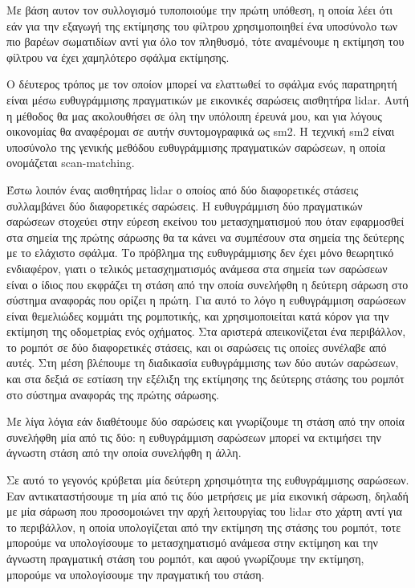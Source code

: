 \documentclass[a4paper,10pt]{article}
\begin{document}
Με βάση αυτον τον συλλογισμό τυποποιούμε την πρώτη υπόθεση, η οποία λέει ότι
εάν για την εξαγωγή της εκτίμησης του φίλτρου χρησιμοποιηθεί ένα υποσύνολο των
πιο βαρέων σωματιδίων αντί για όλο τον πληθυσμό, τότε αναμένουμε η εκτίμηση
του φίλτρου να έχει χαμηλότερο σφάλμα εκτίμησης.


Ο δέυτερος τρόπος με τον οποίον μπορεί να ελαττωθεί το σφάλμα ενός
παρατηρητή είναι μέσω ευθυγράμμισης πραγματικών με εικονικές σαρώσεις αισθητήρα
lidar. Αυτή η μέθοδος θα μας ακολουθήσει σε όλη την υπόλοιπη έρευνά μου, και
για λόγους οικονομίας θα αναφέρομαι σε αυτήν συντομογραφικά ως sm2. Η τεχνική
sm2 είναι υποσύνολο της γενικής μεθόδου ευθυγράμμισης πραγματικών σαρώσεων, η
οποία ονομάζεται scan-matching.

Έστω λοιπόν ένας αισθητήρας lidar ο οποίος από δύο διαφορετικές στάσεις
συλλαμβάνει δύο διαφορετικές σαρώσεις. Η ευθυγράμμιση δύο πραγματικών σαρώσεων
στοχεύει στην εύρεση εκείνου του μετασχηματισμού που όταν εφαρμοσθεί στα σημεία
της πρώτης σάρωσης θα τα κάνει να συμπέσουν στα σημεία της δεύτερης με το
ελάχιστο σφάλμα. Το πρόβλημα της ευθυγράμμισης δεν έχει μόνο θεωρητικό
ενδιαφέρον, γιατι ο τελικός μετασχηματισμός ανάμεσα στα σημεία των σαρώσεων
είναι ο ίδιος που εκφράζει τη στάση από την οποία συνελήφθη η δεύτερη σάρωση
στο σύστημα αναφοράς που ορίζει η πρώτη. Για αυτό το λόγο η ευθυγράμμιση
σαρώσεων είναι θεμελιώδες κομμάτι της ρομποτικής, και χρησιμοποιείται κατά
κόρον για την εκτίμηση της οδομετρίας ενός οχήματος.  Στα αριστερά
απεικονίζεται ένα περιβάλλον, το ρομπότ σε δύο διαφορετικές στάσεις, και οι
σαρώσεις τις οποίες συνέλαβε από αυτές. Στη μέση βλέπουμε τη διαδικασία
ευθυγράμμισης των δύο αυτών σαρώσεων, και στα δεξιά σε εστίαση την εξέλιξη της
εκτίμησης της δεύτερης στάσης του ρομπότ στο σύστημα αναφοράς της πρώτης
σάρωσης.

Με λίγα λόγια εάν διαθέτουμε δύο σαρώσεις και γνωρίζουμε τη στάση από την οποία
συνελήφθη μία από τις δύο: η ευθυγράμμιση σαρώσεων μπορεί να εκτιμήσει την
άγνωστη στάση από την οποία συνελήφθη η άλλη.

Σε αυτό το γεγονός κρύβεται μία δεύτερη χρησιμότητα της ευθυγράμμισης σαρώσεων.
Εαν αντικαταστήσουμε τη μία από τις δύο μετρήσεις με μία εικονική σάρωση,
δηλαδή με μία σάρωση που προσομοιώνει την αρχή λειτουργίας του lidar στο χάρτη
αντί για το περιβάλλον, η οποία υπολογίζεται από την εκτίμηση της στάσης του
ρομπότ, τοτε μπορούμε να υπολογίσουμε το μετασχηματισμό ανάμεσα στην εκτίμηση
και την άγνωστη πραγματική στάση του ρομπότ, και αφού γνωρίζουμε την εκτίμηση,
μπορούμε να υπολογίσουμε την πραγματική του στάση.
\end{document}
